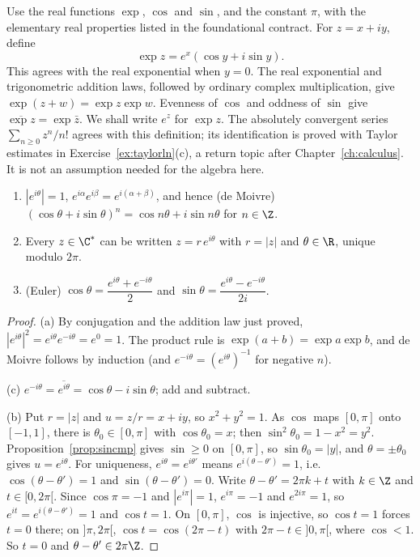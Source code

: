 Use the real functions $\exp$, $\cos$ and $\sin$, and the constant $\pi$, with the elementary real properties listed in the foundational contract. For $z=x+iy$, define
\[
\exp z=e^x(\cos y+i\sin y).
\]
This agrees with the real exponential when $y=0$. The real exponential and trigonometric addition laws, followed by ordinary complex multiplication, give $\exp(z+w)=\exp z\exp w$. Evenness of $\cos$ and oddness of $\sin$ give $\overline{\exp z}=\exp\bar z$. We shall write $e^z$ for $\exp z$. The absolutely convergent series $\sum_{n\ge0}z^n/n!$ agrees with this definition; its identification is proved with Taylor estimates in Exercise~\ref{ex:taylorln}(c), a return topic after Chapter~\ref{ch:calculus}. It is not an assumption needed for the algebra here.

\begin{proposition}\label{prop:expform}
\begin{enumerate}[label=(\alph*)]
\item $|e^{i\theta}|=1$, $e^{i\alpha}e^{i\beta}=e^{i(\alpha+\beta)}$, and hence (de Moivre) $(\cos\theta+i\sin\theta)^n=\cos n\theta+i\sin n\theta$ for $n\in\Z$.
\item Every $z\in\C^*$ can be written $z=r\,e^{i\theta}$ with $r=|z|$ and $\theta\in\R$, unique modulo $2\pi$.
\item (Euler) $\cos\theta=\dfrac{e^{i\theta}+e^{-i\theta}}2$ and $\sin\theta=\dfrac{e^{i\theta}-e^{-i\theta}}{2i}$.
\end{enumerate}
\end{proposition}
\begin{proof}
(a) By conjugation and the addition law just proved, $|e^{i\theta}|^2=e^{i\theta}e^{-i\theta}=e^0=1$. The product rule is $\exp(a+b)=\exp a\exp b$, and de Moivre follows by induction (and $e^{-i\theta}=(e^{i\theta})^{-1}$ for negative $n$).

(c) $e^{-i\theta}=\overline{e^{i\theta}}=\cos\theta-i\sin\theta$; add and subtract.

(b) Put $r=|z|$ and $u=z/r=x+iy$, so $x^2+y^2=1$. As $\cos$ maps $[0,\pi]$ onto $[-1,1]$, there is $\theta_0\in[0,\pi]$ with $\cos\theta_0=x$; then $\sin^2\theta_0=1-x^2=y^2$. Proposition~\ref{prop:sincmp} gives $\sin\ge0$ on $[0,\pi]$, so $\sin\theta_0=|y|$, and $\theta=\pm\theta_0$ gives $u=e^{i\theta}$. For uniqueness, $e^{i\theta}=e^{i\theta'}$ means $e^{i(\theta-\theta')}=1$, i.e.\ $\cos(\theta-\theta')=1$ and $\sin(\theta-\theta')=0$. Write $\theta-\theta'=2\pi k+t$ with $k\in\Z$ and $t\in[0,2\pi[$. Since $\cos\pi=-1$ and $|e^{i\pi}|=1$, $e^{i\pi}=-1$ and $e^{2i\pi}=1$, so $e^{it}=e^{i(\theta-\theta')}=1$ and $\cos t=1$. On $[0,\pi]$, $\cos$ is injective, so $\cos t=1$ forces $t=0$ there; on $]\pi,2\pi[$, $\cos t=\cos(2\pi-t)$ with $2\pi-t\in]0,\pi[$, where $\cos<1$. So $t=0$ and $\theta-\theta'\in2\pi\Z$.
\end{proof}


